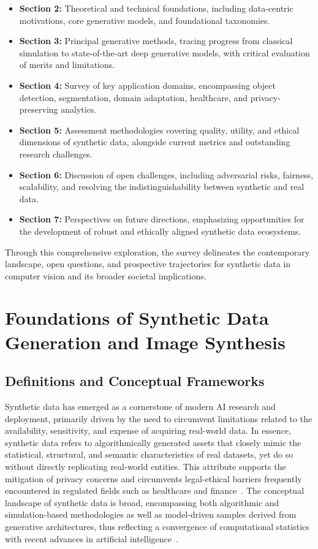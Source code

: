 \begin{itemize}
    \item \textbf{Section 2:} Theoretical and technical foundations, including data-centric motivations, core generative models, and foundational taxonomies.
    \item \textbf{Section 3:} Principal generative methods, tracing progress from classical simulation to state-of-the-art deep generative models, with critical evaluation of merits and limitations.
    \item \textbf{Section 4:} Survey of key application domains, encompassing object detection, segmentation, domain adaptation, healthcare, and privacy-preserving analytics.
    \item \textbf{Section 5:} Assessment methodologies covering quality, utility, and ethical dimensions of synthetic data, alongside current metrics and outstanding research challenges.
    \item \textbf{Section 6:} Discussion of open challenges, including adversarial risks, fairness, scalability, and resolving the indistinguishability between synthetic and real data.
    \item \textbf{Section 7:} Perspectives on future directions, emphasizing opportunities for the development of robust and ethically aligned synthetic data ecosystems.
\end{itemize}

Through this comprehensive exploration, the survey delineates the contemporary landscape, open questions, and prospective trajectories for synthetic data in computer vision and its broader societal implications.

\section{Foundations of Synthetic Data Generation and Image Synthesis}

\subsection{Definitions and Conceptual Frameworks}

Synthetic data has emerged as a cornerstone of modern AI research and deployment, primarily driven by the need to circumvent limitations related to the availability, sensitivity, and expense of acquiring real-world data. In essence, synthetic data refers to algorithmically generated assets that closely mimic the statistical, structural, and semantic characteristics of real datasets, yet do so without directly replicating real-world entities. This attribute supports the mitigation of privacy concerns and circumvents legal-ethical barriers frequently encountered in regulated fields such as healthcare and finance~\cite{ref87}. The conceptual landscape of synthetic data is broad, encompassing both algorithmic and simulation-based methodologies as well as model-driven samples derived from generative architectures, thus reflecting a convergence of computational statistics with recent advances in artificial intelligence~\cite{ref1,ref13,ref64,ref87}.

